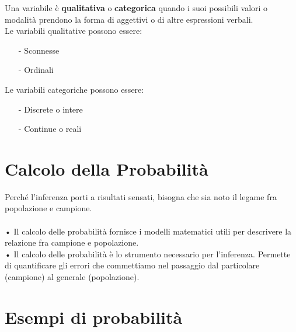 \documentclass[12pt, letterpaper]{article}
\begin{document}
Una variabile è \textbf{qualitativa} o \textbf{categorica} quando i suoi possibili valori o modalità
prendono la forma di aggettivi o di altre espressioni verbali.
\\
Le variabili qualitative possono essere:
\begin{itemize}
   \item[-] Sconnesse
   \item[-] Ordinali

\end{itemize}
Le variabili categoriche possono essere:
\begin{itemize}
   \item[-] Discrete o intere
   \item[-] Continue o reali
\end{itemize}

\section{Calcolo della Probabilità}

Perché l’inferenza porti a risultati sensati, bisogna che sia noto il
legame fra popolazione e campione.\\
\\
• Il calcolo delle probabilità fornisce i modelli matematici utili per
descrivere la relazione fra campione e popolazione.\\
• Il calcolo delle probabilità è lo strumento necessario per l’inferenza.
Permette di quantificare gli errori che commettiamo nel passaggio
dal particolare (campione) al generale (popolazione).

\section{Esempi di probabilità}
\end{document}
